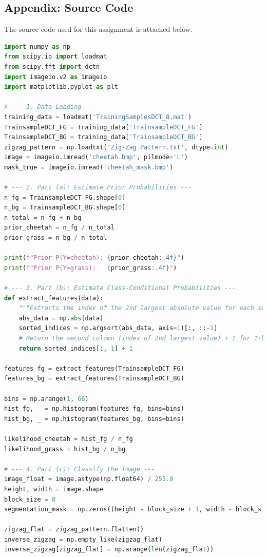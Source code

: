 \newpage
\subsection{Appendix: Source Code}
The source code used for this assignment is attached below.

\begin{lstlisting}[language=Python, caption={Python code for HW1}, label={code:hw1}]
import numpy as np
from scipy.io import loadmat
from scipy.fft import dctn
import imageio.v2 as imageio
import matplotlib.pyplot as plt

# --- 1. Data Loading ---
training_data = loadmat('TrainingSamplesDCT_8.mat')
TrainsampleDCT_FG = training_data['TrainsampleDCT_FG']
TrainsampleDCT_BG = training_data['TrainsampleDCT_BG']
zigzag_pattern = np.loadtxt('Zig-Zag Pattern.txt', dtype=int)
image = imageio.imread('cheetah.bmp', pilmode='L')
mask_true = imageio.imread('cheetah_mask.bmp')

# --- 2. Part (a): Estimate Prior Probabilities ---
n_fg = TrainsampleDCT_FG.shape[0]
n_bg = TrainsampleDCT_BG.shape[0]
n_total = n_fg + n_bg
prior_cheetah = n_fg / n_total
prior_grass = n_bg / n_total

print(f"Prior P(Y=cheetah): {prior_cheetah:.4f}")
print(f"Prior P(Y=grass):   {prior_grass:.4f}")

# --- 3. Part (b): Estimate Class-Conditional Probabilities ---
def extract_features(data):
    """Extracts the index of the 2nd largest absolute value for each sample."""
    abs_data = np.abs(data)
    sorted_indices = np.argsort(abs_data, axis=1)[:, ::-1]
    # Return the second column (index of 2nd largest value) + 1 for 1-based indexing
    return sorted_indices[:, 1] + 1

features_fg = extract_features(TrainsampleDCT_FG)
features_bg = extract_features(TrainsampleDCT_BG)

bins = np.arange(1, 66)
hist_fg, _ = np.histogram(features_fg, bins=bins)
hist_bg, _ = np.histogram(features_bg, bins=bins)

likelihood_cheetah = hist_fg / n_fg
likelihood_grass = hist_bg / n_bg

# --- 4. Part (c): Classify the Image ---
image_float = image.astype(np.float64) / 255.0
height, width = image.shape
block_size = 8
segmentation_mask = np.zeros((height - block_size + 1, width - block_size + 1))

zigzag_flat = zigzag_pattern.flatten()
inverse_zigzag = np.empty_like(zigzag_flat)
inverse_zigzag[zigzag_flat] = np.arange(len(zigzag_flat))


\end{lstlisting}
